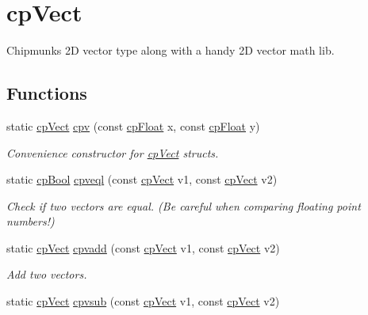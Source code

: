 \hypertarget{group__cp_vect}{}\section{cp\+Vect}
\label{group__cp_vect}


Chipmunk\textquotesingle{}s 2\+D vector type along with a handy 2\+D vector math lib.  


\subsection*{Functions}
\begin{DoxyCompactItemize}
\item 
\hypertarget{group__cp_vect_ga80c0be464748ff46ad20b58e22ea7d81}{}static \hyperlink{structcp_vect}{cp\+Vect} \hyperlink{group__cp_vect_ga80c0be464748ff46ad20b58e22ea7d81}{cpv} (const \hyperlink{group__basic_types_gac1ed65573e035bf892505768c852d8d3}{cp\+Float} x, const \hyperlink{group__basic_types_gac1ed65573e035bf892505768c852d8d3}{cp\+Float} y)\label{group__cp_vect_ga80c0be464748ff46ad20b58e22ea7d81}

\begin{DoxyCompactList}\small\item\em Convenience constructor for \hyperlink{structcp_vect}{cp\+Vect} structs. \end{DoxyCompactList}\item 
\hypertarget{group__cp_vect_gae5081f933bcc2c64c76d7e7caaf2d631}{}static \hyperlink{group__basic_types_gabc5e752c48f3449ca26ef413ecbd647e}{cp\+Bool} \hyperlink{group__cp_vect_gae5081f933bcc2c64c76d7e7caaf2d631}{cpveql} (const \hyperlink{structcp_vect}{cp\+Vect} v1, const \hyperlink{structcp_vect}{cp\+Vect} v2)\label{group__cp_vect_gae5081f933bcc2c64c76d7e7caaf2d631}

\begin{DoxyCompactList}\small\item\em Check if two vectors are equal. (Be careful when comparing floating point numbers!) \end{DoxyCompactList}\item 
\hypertarget{group__cp_vect_ga167e0bde13a745299bd5d4164d7c796b}{}static \hyperlink{structcp_vect}{cp\+Vect} \hyperlink{group__cp_vect_ga167e0bde13a745299bd5d4164d7c796b}{cpvadd} (const \hyperlink{structcp_vect}{cp\+Vect} v1, const \hyperlink{structcp_vect}{cp\+Vect} v2)\label{group__cp_vect_ga167e0bde13a745299bd5d4164d7c796b}

\begin{DoxyCompactList}\small\item\em Add two vectors. \end{DoxyCompactList}\item 
\hypertarget{group__cp_vect_gafd88a5bbd4b5de25aa31e44fdf01e259}{}static \hyperlink{structcp_vect}{cp\+Vect} \hyperlink{group__cp_vect_gafd88a5bbd4b5de25aa31e44fdf01e259}{cpvsub} (const \hyperlink{structcp_vect}{cp\+Vect} v1, const \hyperlink{structcp_vect}{cp\+Vect} v2)\label{group__cp_vect_gafd88a5bbd4b5de25aa31e44fdf01e259}


\end{DoxyCompactItemize}
